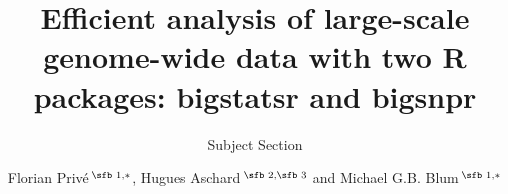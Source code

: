 \documentclass{bioinfo}
\begin{document}

\subtitle{Subject Section}

\title[R packages for analyzing genome-wide data]{Efficient analysis of large-scale genome-wide data with two R packages: bigstatsr and bigsnpr}
\author[Sample \textit{et~al}.]{Florian Priv\'e\,$^{\text{\sfb 1,}*}$, Hugues Aschard\,$^{\text{\sfb 2,\sfb 3}}$ and Michael G.B. Blum\,$^{\text{\sfb 1,}*}$}
\address{$^{\text{\sf 1}}$Universit\'e Grenoble Alpes, CNRS, Laboratoire TIMC-IMAG, UMR 5525, France, \\
$^{\text{\sf 2}}$Centre de Bioinformatique, Biostatistique et Biologie Int\'egrative (C3BI), Institut Pasteur, Paris, France and \\
$^{\text{\sf 3}}$Department of Epidemiology, Harvard T.H. Chan School of Public Health, Boston, Massachusetts, USA.}



\end{document}
